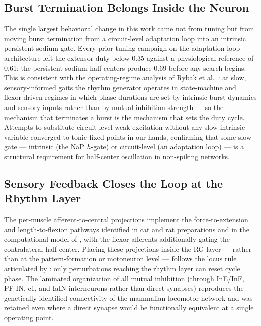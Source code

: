 \subsection{Burst Termination Belongs Inside the Neuron}

The single largest behavioral change in this work came not from tuning
but from moving burst termination from a circuit-level adaptation loop
into an intrinsic persistent-sodium gate. Every prior tuning campaign
on the adaptation-loop architecture left the extensor duty below 0.35
against a physiological reference of 0.61; the persistent-sodium
half-centers produce 0.69 before any search begins. This is
consistent with the operating-regime analysis of Rybak et
al.~\citep{rybak2024, rybak2025}: at slow, sensory-informed gaits the
rhythm generator operates in state-machine and flexor-driven regimes
in which phase durations are set by intrinsic burst dynamics and
sensory inputs rather than by mutual-inhibition strength — so the
mechanism that terminates a burst is the mechanism that sets the duty
cycle. Attempts to substitute circuit-level weak excitation without
any slow intrinsic variable converged to tonic fixed points in our
hands, confirming that some slow gate — intrinsic (the NaP $h$-gate)
or circuit-level (an adaptation loop) — is a structural requirement
for half-center oscillation in non-spiking networks.

\subsection{Sensory Feedback Closes the Loop at the Rhythm Layer}

The per-muscle afferent-to-central projections implement the
force-to-extension and length-to-flexion pathways identified in cat
and rat preparations \citep{gossard1994, conway1987, perreault2011,
dominguez2020} and in the computational model of \citet{rybak2025},
with the flexor afferents additionally gating the contralateral
half-center. Placing these projections inside the RG layer — rather
than at the pattern-formation or motoneuron level — follows the locus
rule articulated by \citet{rybak2015}: only perturbations reaching the
rhythm layer can reset cycle phase. The laminated organization of all
mutual inhibition (through InE/InF, PF-IN, c1, and IaIN interneurons
rather than direct synapses) reproduces the genetically identified
connectivity of the mammalian locomotor network
\citep{shevtsova2026, talpalar2013, zhang2022} and was retained even
where a direct synapse would be functionally equivalent at a single
operating point.

